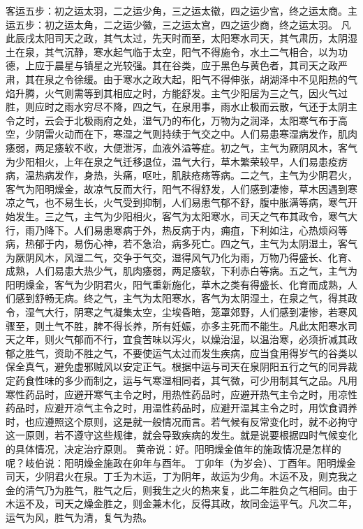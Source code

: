 \documentclass[a4paper,12pt,UTF8,twoside]{ctexbook}
\begin{document}
客运五步：初之运太羽，二之运少角，三之运太徽，四之运少宫，终之运太商。主运五步：初之运太角，二之运少徽，三之运太宫，四之运少商，终之运太羽。
凡此辰戌太阳司天之政，其气太过，先天时而至，太阳寒水司天，其气肃历，太阴湿土在泉，其气沉静，寒水起气临于太空，阳气不得施令，水土二气相合，以为功德，上应于晨星与镇星之光较强。其在谷类，应于黑色与黄色者，其司天之政严肃，其在泉之令徐缓。由于寒水之政大起，阳气不得伸张，胡湖泽中不见阳热的气焰升腾，火气则需等到其相应之时，方能舒发。主气少阳居为三之气，因火气过胜，则应时之雨水穷尽不降，四之气，在泉用事，雨水止极而云散，气还于太阴主令之时，云会于北极雨府之处，湿气乃的布化，万物为之润泽，太阳寒气布于高空，少阴雷火动而在下，寒湿之气则持续于气交之中。人们易患寒湿病发作，肌肉痿弱，两足痿软不收，大便泄泻，血液外溢等症。初之气，主气为厥阴风木，客气为少阳相火，上年在泉之气迁移退位，温气大行，草木繁荣较早，人们易患疫疠病，温热病发作，身热，头痛，呕吐，肌肤疮疡等病。二之气，主气为少阴君火，客气为阳明燥金，故凉气反而大行，阳气不得舒发，人们感到凄惨，草木因遇到寒凉之气，也不易生长，火气受到抑制，人们易患气郁不舒，腹中胀满等病，寒气开始发生。三之气，主气为少阳相火，客气为太阳寒水，司天之气布其政令，寒气大行，雨乃降下。人们易患寒病于外，热反病于内，痈疽，下利如注，心热烦闷等病，热郁于内，易伤心神，若不急治，病多死亡。四之气，主气为太阴湿土，客气为厥阴风木，风湿二气，交争于气交，湿得风气乃化为雨，万物乃得盛长、化育、成熟，人们易患大热少气，肌肉痿弱，两足痿软，下利赤白等病。五之气，主气为阳明燥金，客气为少阴君火，阳气重新施化，草木之类有得盛长、化育而成熟，人们感到舒畅无病。终之气，主气为太阳寒水，客气为太阴湿土，在泉之气，得其政令，湿气大行，阴寒之气凝集太空，尘埃昏暗，笼罩郊野，人们感到凄惨，若寒风骤至，则土气不胜，脾不得长养，所有妊娠，亦多主死而不能生。凡此太阳寒水司天之年，则火气郁而不行，宜食苦味以泻火，以燥治湿，以温治寒，必须折减其政郁之胜气，资助不胜之气，不要使运气太过而发生疾病，应当食用得岁气的谷类以保全真气，避免虚邪贼风以安定正气。根据中运与司天在泉阴阳五行之气的同异裁定药食性味的多少而制之，运与气寒湿相同者，其气微，可少用制其气之品。凡用寒性药品时，应避开寒气主令之时，用热性药品时，应避开热气主令之时，用凉性药品时，应避开凉气主令之时，用温性药品时，应避开温其主令之时，用饮食调养时，也应遵照这个原则，这是就一般情况而言。若气候有反常变化时，就不必拘守这一原则，若不遵守这些规律，就会导致疾病的发生。就是说要根据四时气候变化的具体情况，决定治疗原则。
黄帝说：好。阳明燥金值年的施政情况是怎样的呢？岐伯说：阳明燥金施政在卯年与酉年。
丁卯年（为岁会）、丁酉年。阳明燥金司天，少阴君火在泉。丁壬为木运，丁为阴年，故运为少角。木运不及，则克我之金的清气乃为胜气，胜气之后，则我生之火的热来复，此二年胜负之气相同。由于木运不及，司天之燥金胜之，则金兼木化，反得其政，故同金运平气。凡次二年，运气为风，胜气为清，复气为热。
\end{document}
